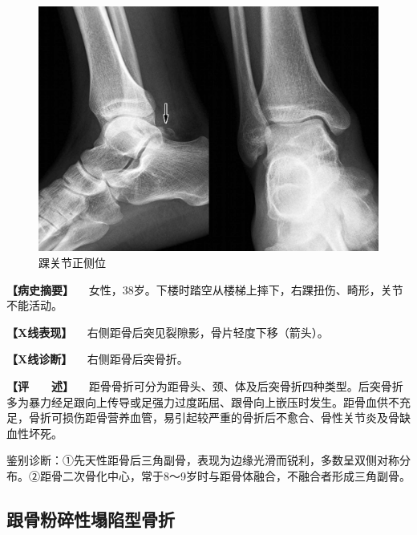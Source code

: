 \begin{figure}[!htbp]
 \centering
 \includegraphics{./images/Image00056.jpg}
 \captionsetup{justification=centering}
 \caption{踝关节正侧位}
 \label{fig2-3-29}
  \end{figure} 

\textbf{【病史摘要】}
　女性，38岁。下楼时踏空从楼梯上摔下，右踝扭伤、畸形，关节不能活动。

\textbf{【X线表现】} 　右侧距骨后突见裂隙影，骨片轻度下移（箭头）。

\textbf{【X线诊断】} 　右侧距骨后突骨折。

\textbf{【评　　述】}
　距骨骨折可分为距骨头、颈、体及后突骨折四种类型。后突骨折多为暴力经足跟向上传导或足强力过度跖屈、跟骨向上嵌压时发生。距骨血供不充足，骨折可损伤距骨营养血管，易引起较严重的骨折后不愈合、骨性关节炎及骨缺血性坏死。

鉴别诊断：①先天性距骨后三角副骨，表现为边缘光滑而锐利，多数呈双侧对称分布。②距骨二次骨化中心，常于8～9岁时与距骨体融合，不融合者形成三角副骨。

\subsection{跟骨粉碎性塌陷型骨折}

